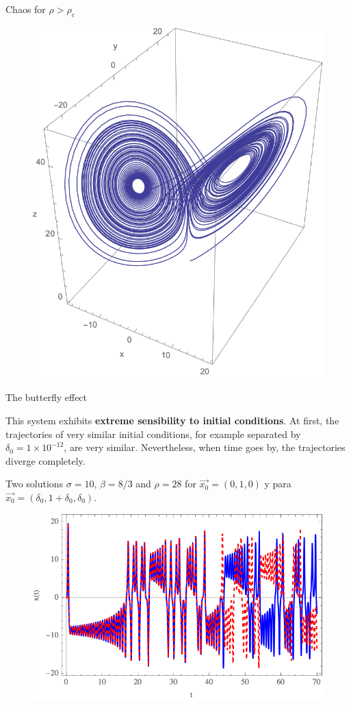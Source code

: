 \documentclass[hyperref={pdfpagelabels=false}]{beamer}
\begin{document}
\begin{frame}{Chaos for $\rho>\rho_{c}$}

\begin{figure}

\includegraphics[width=0.55\linewidth]{Figures/atractor3d.png}

\end{figure}

\end{frame}

\begin{frame}{The butterfly effect}

This system exhibits \textbf{extreme sensibility to initial conditions}. At first, the trajectories of very similar initial conditions, for example separated by $\delta_{0}=1\times 10^{-12}$, are very similar. Nevertheless, when time goes by, the trajectories diverge completely.

\begin{block}{Two solutions}
$\sigma=10$, $\beta=8/3$ and $\rho=28$ for $\Vec{x_{0}}=(0,1,0)$ y para $\Vec{x_{0}}=(\delta_{0},1+\delta_{0},\delta_{0})$.
\end{block}


\begin{figure}

\includegraphics[width=0.6\linewidth]{Figures/comparacionx.png}

\end{figure}

\end{frame}
\end{document}
